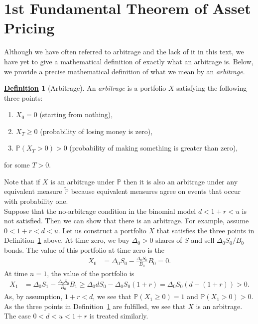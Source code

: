 \documentclass[12pt]{book}
\numberwithin{equation}{chapter}
\theoremstyle{plain}
\numberwithin{theorem}{section}
\theoremstyle{definition}
\newtheorem{definition}[theorem]{\underline{Definition}}
\numberwithin{exercise}{chapter}
\newcommand{\<}{\langle}
\renewcommand{\>}{\rangle}
\renewcommand{\(}{\left(}
\renewcommand{\)}{\right)}
\renewcommand{\[}{\left[}
\renewcommand{\]}{\right]}
\newcommand\Pb{\mathds{P}}
\newcommand\Del{\Delta}
\newcommand\Pbt{\widetilde{\Pb}}
\theoremstyle{definition}
\numberwithin{question}{section}
\begin{document}
\section{1st Fundamental Theorem of Asset Pricing}
Although we have often referred to arbitrage and the lack of it in this text, we have yet to give a mathematical definition of exactly what an arbitrage is.  Below, we provide a precise mathematical definition of what we mean by an \textit{arbitrage}.
\begin{definition}[Arbitrage] \label{def:arb}
	An \textit{arbitrage} is a portfolio $X$ satisfying the following three points:
	\begin{enumerate}
		\item $X_0 = 0$ (starting from nothing),
		\item $X_T \geq 0$ (probability of losing money is zero),
		\item $\Pb (X_T > 0) > 0$ (probability of making something is greater than zero),
	\end{enumerate}
for some $T > 0$.
\end{definition}
\noindent
Note that if $X$ is an arbitrage under $\Pb$ then it is also an arbitrage under any equivalent measure $\Pbt$ because equivalent measures agree on events that occur with probability one.
\\[0.5em]
Suppose that the no-arbitrage condition in the binomial model $d < 1+r < u$ is not satisfied.  Then we can show that there is an arbitrage. For example, assume $0 < 1+r  < d  < u$. Let us construct a portfolio $X$ that satisfies the three points in Definition~\ref{def:arb} above.  At time zero, we buy $\Del_0 > 0$ shares of $S$ and sell $\Del_0 S_0 / B_0$ bonds. The value of this portfolio at time zero is the
\begin{align}
	X_0 
		&= \Del_0 S_0 - \frac{\Del_0 S_0}{B_0} B_0  = 0 .
\end{align}
At time $n=1$, the value of the portfolio is
\begin{align}
	X_1 
	&= 			\Del_0 S_1 - \frac{\Del_0 S_0}{B_0} B_1 
	\geq		\Del_0 d S_0 - \Del_0 S_0 (1+r)
	=				\Del_0 S_0 ( d - (1+r) ) > 0 .
\end{align}
As, by assumption, $1+r < d$, we see that $\Pb (X_1 \geq 0) = 1$ and $\Pb (X_1 > 0) > 0$. As the three points in Definition~\ref{def:arb} are fulfilled, we see that $X$ is an arbitrage. The case $0 < d  < u < 1+r$ is treated similarly.
\end{document}
